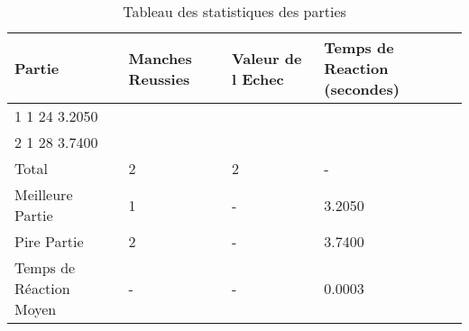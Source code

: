 \begin{table}[ht]
\centering
\begin{tabular}{|l|l|l|l|}
\hline
Partie & Manches Reussies & Valeur de l Echec & Temps de Reaction (secondes) \\ \hline
1 1 24 3.2050 &  &  &  \\ \hline
2 1 28 3.7400 &  &  &  \\ \hline
Total & 2 & 2 & - \\ \hline
Meilleure Partie & 1 & - & 3.2050 \\ \hline
Pire Partie & 2 & - & 3.7400 \\ \hline
Temps de Réaction Moyen & - & - & 0.0003 \\ \hline
\end{tabular}
\caption{Tableau des statistiques des parties}
\end{table}
